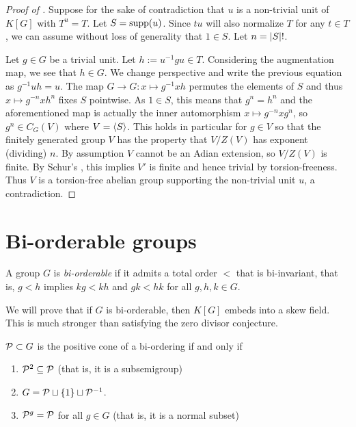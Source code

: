 \begin{proof}[Proof of ]
    Suppose for the sake of contradiction that $u$ is a non-trivial unit of $K[G]$ with $T^u = T$.
    Let $S = \operatorname{supp}(u)$.
    Since $t u$ will also normalize $T$ for any $t \in T$, we can assume without loss of generality that $1 \in S$.
    Let $n = \lvert S \rvert!$.

    Let $g \in G$ be a trivial unit.
    Let $h := u^{-1} g u \in T$.
    Considering the augmentation map, we see that $h \in G$.
    We change perspective and write the previous equation as $g^{-1} u h = u$.
    The map $G \to G \colon x \mapsto g^{-1} x h$ permutes the elements of $S$ and thus $x \mapsto g^{-n} x h^n$ fixes $S$ pointwise.
    As $1 \in S$, this means that $g^n = h^n$ and the aforementioned map is actually the inner automorphism $x \mapsto g^{-n} x g^n$, so $g^n \in C_G(V)$ where $V = \langle S \rangle$.
    This holds in particular for $g \in V$ so that the finitely generated group $V$ has the property that $V / Z(V)$ has exponent (dividing) $n$.
    By assumption $V$ cannot be an Adian extension, so $V / Z(V)$ is finite.
    By Schur's , this implies $V'$ is finite and hence trivial by torsion-freeness.
    Thus $V$ is a torsion-free abelian group supporting the non-trivial unit $u$, a contradiction.
\end{proof}

\section{Bi-orderable groups}

\begin{definition}
    A group $G$ is \emph{bi-orderable} if it admits a total order $<$ that is bi-invariant, that is, $g < h$ implies $kg < kh$ and $gk < hk$ for all $g, h, k \in G$.
\end{definition}

We will prove that if $G$ is bi-orderable, then $K[G]$ embeds into a skew field.
This is much stronger than satisfying the zero divisor conjecture.

\begin{lemma}
    $\mathcal{P} \subset G$ is the positive cone of a bi-ordering if and only if
    \begin{enumerate}
        \item $\mathcal{P}^2 \subseteq \mathcal{P}$ (that is, it is a subsemigroup)
        \item $G = \mathcal{P} \sqcup \{1\} \sqcup \mathcal{P}^{-1}$.
        \item $\mathcal{P}^g = \mathcal{P}$ for all $g \in G$ (that is, it is a normal subset)
    \end{enumerate}
\end{lemma}


